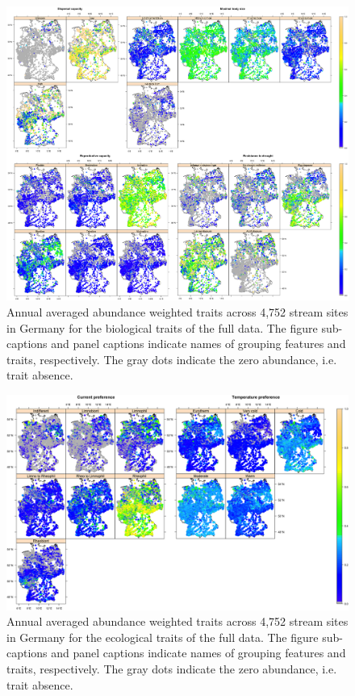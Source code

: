\begin{landscape}
\begin{figure}[t]
  \centering
  \vspace{-1.5cm}
  \includegraphics[width=0.8\linewidth]{Figures/Fig_4_3.png}
  \caption{Annual averaged abundance weighted traits across 4,752 stream sites in Germany for the biological traits of the full data. The figure sub-captions and panel captions indicate names of grouping features and traits, respectively. The gray dots indicate the zero abundance, i.e. trait absence.}
  \label{Fig_4_3}
\end{figure}

\newpage

\begin{figure}[t]
  \centering
  \includegraphics[width=\linewidth]{Figures/Fig_4_4.png}
  \caption{Annual averaged abundance weighted traits across 4,752 stream sites in Germany for the ecological traits of the full data. The figure sub-captions and panel captions indicate names of grouping features and traits, respectively. The gray dots indicate the zero abundance, i.e. trait absence.}
  \label{Fig_4_4}
\end{figure}

\end{landscape}

